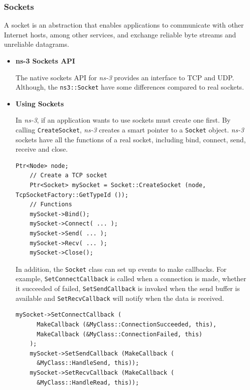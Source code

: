 \subsubsection{Sockets}
A socket is an abstraction that enables applications to communicate with other Internet hosts, among other services,
and exchange reliable byte streams and unreliable datagrams.

\begin{itemize}
  \item \textbf{ns-3 Sockets API} 
  
  The native sockets API for \textit{ns-3} provides an interface 
  to TCP and UDP. Although, the \texttt{ns3::Socket} have some differences compared to
  real sockets. 

  \item \textbf{Using Sockets} 

  In \textit{ns-3}, if an application wants to use sockets must create one first. By 
  calling \texttt{CreateSocket}, \textit{ns-3} creates a smart pointer to a \texttt{Socket} object.
  \textit{ns-3} sockets have all the functions of a real socket, including bind, connect, send, receive
  and close.

  \begin{lstlisting}[language=myC++, caption={ns-3 Socket programming}, captionpos=b]
    Ptr<Node> node;
    // Create a TCP socket
    Ptr<Socket> mySocket = Socket::CreateSocket (node, TcpSocketFactory::GetTypeId ());
    // Functions
    mySocket->Bind();
    mySocket->Connect( ... );
    mySocket->Send( ... );
    mySocket->Recv( ... );
    mySocket->Close();
  \end{lstlisting}

  In addition, the \texttt{Socket} class can set up events to make callbacks. For example, 
  \texttt{SetConnectCallback} is called when a connection is made, whether it succeeded of 
  failed, \texttt{SetSendCallback} is invoked when the send buffer is available
  and \texttt{SetRecvCallback} will notify when the data is received.

  \begin{lstlisting}[language=myC++, caption={Socket callbacks}, captionpos=b]
    mySocket->SetConnectCallback (
      MakeCallback (&MyClass::ConnectionSucceeded, this),
      MakeCallback (&MyClass::ConnectionFailed, this)
    );
    mySocket->SetSendCallback (MakeCallback (
      &MyClass::HandleSend, this));
    mySocket->SetRecvCallback (MakeCallback (
      &MyClass::HandleRead, this));
  \end{lstlisting}
\end{itemize}

